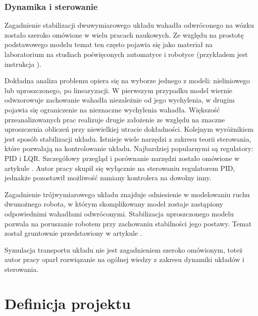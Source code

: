 \documentclass[12pt, twoside, openany]{report}
\theoremstyle{definition}
\begin{document}
\subsection{Dynamika i sterowanie}
Zagadnienie stabilizacji dwuwymiarowego układu wahadła odwróconego na wózku zostało szeroko omówione w wielu pracach naukowych. Ze względu na prostotę podstawowego modelu temat ten często pojawia się jako materiał na laboratorium na studiach poświęconych automatyce i robotyce (przykładem jest instrukcja \cite{LMIP}).

Dokładna analiza problemu opiera się na wyborze jednego z modeli: nieliniowego lub uproszczonego, po linearyzacji. W pierwszym przypadku model wiernie odwzorowuje zachowanie wahadła niezależnie od jego wychylenia, w drugim pojawia się ograniczenie na nieznaczne wychylenia wahadła. Większość przeanalizowanych prac realizuje drugie założenie ze względu na znaczne uproszczenia obliczeń przy niewielkiej utracie dokładności. Kolejnym wyróżnikiem jest sposób stabilizacji układu. Istnieje wiele narzędzi z zakresu teorii sterowania, które pozwalają na kontrolowanie układu. Najbardziej popularnymi są regulatory: PID i LQR. Szczegółowy przegląd i porównanie narzędzi zostało omówione w artykule \cite{OptimalControl}. Autor pracy skupił się wyłącznie na sterowaniu regulatorem PID, jednakże pozostawił możliwość zamiany kontrolera na dowolny inny.

Zagadnienie trójwymiarowego układu znajduje odniesienie w modelowaniu ruchu dwunożnego robota, w którym skomplikowany model zostaje zastąpiony odpowiednimi wahadłami odwróconymi. Stabilizacja uproszczonego modelu pozwala na poruszanie robotem przy zachowaniu stabilności jego postawy. Temat został gruntownie przedstawiony w artykule \cite{BipedWalking}.

Symulacja transportu układu nie jest zagadnieniem szeroko omówionym, toteż autor pracy oparł rozwiązanie na ogólnej wiedzy z zakresu dynamiki układów i sterowania. 


\newpage
\chapter{Definicja projektu}
\end{document}
